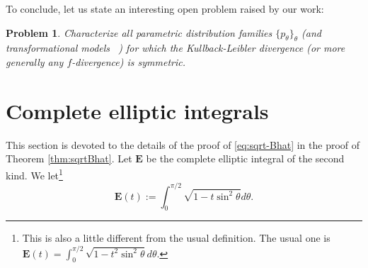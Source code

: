\documentclass[journal]{IEEEtran}
\newtheorem{problem}[theorem]{Problem}
\begin{document}
To conclude, let us state an interesting open problem raised by our work:
\begin{problem}
Characterize all parametric distribution families $\{p_\theta\}_\theta$ (and transformational models ~\cite{StatTransfModel-2012}) for which the Kullback-Leibler divergence
 (or more generally any $f$-divergence) is symmetric.
\end{problem}








%


\appendices

\section{Complete elliptic integrals}\label{sec:cei}

This section is devoted to the details of the proof of \eqref{eq:sqrt-Bhat} in the proof of Theorem \ref{thm:sqrtBhat}. 
Let $\mathbf{E}$ be the complete elliptic integral of the second kind. 
We let\footnote{This is also a little different from the usual definition. The usual one is $\mathbf{E}(t) = \int_0^{\pi/2} \sqrt{1 - t^2 \sin^2 \theta} d\theta.$} 
\[ \mathbf{E}(t) := \int_0^{\pi/2} \sqrt{1 - t \sin^2 \theta} d\theta. \]
\end{document}
